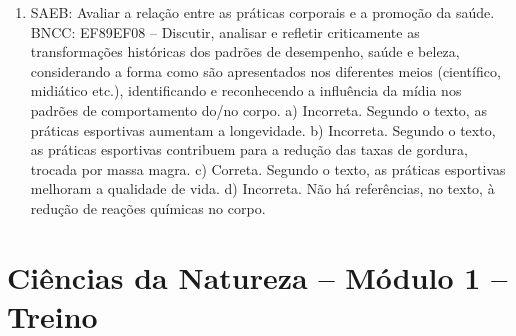 \begin{enumerate}
\item
SAEB: Avaliar a relação entre as práticas corporais e a promoção da
saúde.
BNCC: EF89EF08 -- Discutir, analisar e refletir criticamente as
transformações históricas dos padrões de desempenho, saúde e beleza,
considerando a forma como são apresentados nos diferentes meios
(científico, midiático etc.), identificando e reconhecendo a influência
da mídia nos padrões de comportamento do/no corpo.
a) Incorreta. Segundo o texto, as práticas esportivas aumentam a
longevidade.
b) Incorreta. Segundo o texto, as práticas esportivas contribuem para a 
redução das taxas de gordura, trocada por massa magra.
c) Correta. Segundo o texto, as práticas esportivas melhoram a 
qualidade de vida.  
d) Incorreta. Não há referências, no texto, à redução de reações químicas
no corpo.
\end{enumerate}

\section*{Ciências da Natureza – Módulo 1 –  Treino}

